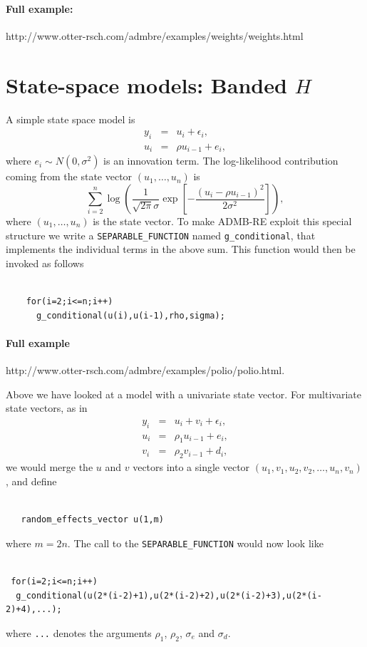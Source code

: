 \documentclass[12pt,letter,reqno]{book}
\begin{document}
\paragraph{Full example:} http://www.otter-rsch.com/admbre/examples/weights/weights.html


\section{State-space models: Banded $H$}
\label{sec:state-space}
A simple state space model is
\begin{eqnarray*}
  y_i &=& u_i + \epsilon_i,\\
  u_i &=& \rho u_{i-1} + e_i,
\end{eqnarray*}
where $e_i\sim N(0,\sigma^2)$ is an innovation term. The log-likelihood contribution
coming from the state vector $(u_1,\ldots,u_n)$ is 
\[
  \sum_{i=2}^n \log\left(\frac{1}{\sqrt{2\pi }\sigma }
                \exp\left[-\frac{(u_{i}-\rho u_{i-1})^{2}}{2\sigma^2}\right]\right),
\]
where $(u_1,\ldots,u_n)$ is the state vector. To make ADMB-RE exploit this 
special structure we write a \texttt{SEPARABLE\_FUNCTION} named
\texttt{g\_conditional}, that implements the individual terms in the above sum.
This function would then be invoked as follows 
\begin{lstlisting}

    for(i=2;i<=n;i++)
      g_conditional(u(i),u(i-1),rho,sigma);

\end{lstlisting}
\paragraph{Full example} http://www.otter-rsch.com/admbre/examples/polio/polio.html.

Above we have looked at a model with a univariate state vector. For multivariate
state vectors, as in 
\begin{eqnarray*}
  y_i &=& u_i + v_i +\epsilon_i,\\
  u_i &=& \rho_1 u_{i-1} + e_i,\\
  v_i &=& \rho_2 v_{i-1} + d_i,
\end{eqnarray*}
we would merge the $u$ and $v$ vectors into a single vector
$(u_1,v_1,u_2,v_2,\ldots,u_n,v_n)$, and define
\begin{lstlisting}

   random_effects_vector u(1,m)

\end{lstlisting}
where $m=2n$. The call to the \texttt{SEPARABLE\_FUNCTION} would now look like
\begin{lstlisting}

 for(i=2;i<=n;i++)
  g_conditional(u(2*(i-2)+1),u(2*(i-2)+2),u(2*(i-2)+3),u(2*(i-2)+4),...);

\end{lstlisting}
where \texttt{...} denotes the arguments $\rho_1$, $\rho_2$, $\sigma_e$ and $\sigma_d$.
\end{document}
